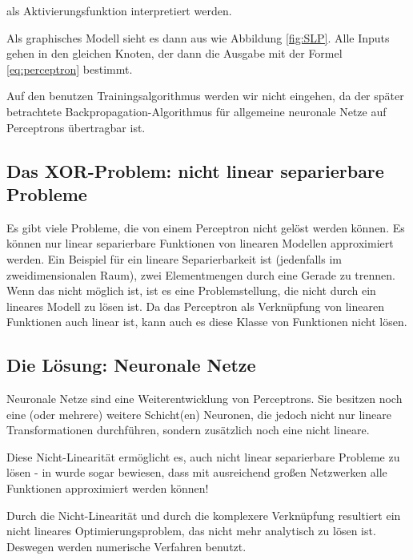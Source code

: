 als Aktivierungsfunktion interpretiert werden.

Als graphisches Modell sieht es dann aus wie Abbildung \ref{fig:SLP}. Alle Inputs gehen in den gleichen Knoten, der dann die Ausgabe mit der Formel \ref{eq:perceptron} bestimmt. 

Auf den benutzen Trainingsalgorithmus werden wir nicht eingehen, da der später betrachtete Backpropagation-Algorithmus für allgemeine neuronale Netze auf Perceptrons übertragbar ist.

\subsection{Das XOR-Problem: nicht linear separierbare Probleme}
Es gibt viele Probleme, die von einem Perceptron nicht gelöst werden können. Es können nur linear separierbare Funktionen von linearen Modellen approximiert werden. Ein Beispiel für ein lineare Separierbarkeit ist (jedenfalls im zweidimensionalen Raum), zwei Elementmengen durch eine Gerade zu trennen. Wenn das nicht möglich ist, ist es eine Problemstellung, die nicht durch ein lineares Modell zu lösen ist. Da das Perceptron als Verknüpfung von linearen Funktionen auch linear ist, kann auch es diese Klasse von Funktionen nicht lösen.

\subsection{Die Lösung: Neuronale Netze}
Neuronale Netze sind eine Weiterentwicklung von Perceptrons. Sie besitzen noch eine (oder mehrere) weitere Schicht(en) Neuronen, die jedoch nicht nur lineare Transformationen durchführen, sondern zusätzlich noch eine nicht lineare.

Diese Nicht-Linearität ermöglicht es, auch nicht linear separierbare Probleme zu lösen - in \cite{cybenko1989approximation} wurde sogar bewiesen, dass mit ausreichend großen Netzwerken alle Funktionen approximiert werden können!

Durch die Nicht-Linearität und durch die komplexere Verknüpfung resultiert ein nicht lineares Optimierungsproblem, das nicht mehr analytisch zu lösen ist. Deswegen werden numerische Verfahren benutzt.


